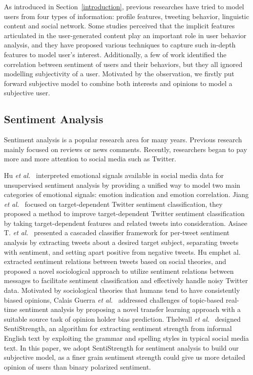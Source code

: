 \documentclass{acm_proc_article-sp}
\begin{document}
As introduced in Section~\ref{introduction}, previous researches have tried to model users from four types of information: profile features, tweeting behavior, linguistic content and social network. 
Some studies perceived that the implicit features articulated in the user-generated content play an important role in user behavior analysis, and they have proposed various techniques to capture such in-depth features to model user's interest. 
Additionally, a few of work identified the correlation between sentiment of users and their behaviors, but they all ignored modelling subjectivity of a user.
Motivated by the observation, we firstly put forward subjective model to combine both interests and opinions to model a subjective user.

\subsection{Sentiment Analysis}
Sentiment analysis is a popular research area for many years. Previous research mainly focused on reviews or news comments. 
Recently, researchers began to pay more and more attention to social media such as Twitter.
 
Hu \emph{et al.}~\cite{Hu:2013www} interpreted emotional signals available in social media data for unsupervised sentiment analysis by providing a unified way to model two main categories of emotional signals: emotion indication and emotion correlation. 
Jiang \emph{et al.}~\cite{Jiang:2011TTS} focused on target-dependent Twitter sentiment classification, they proposed a method to improve target-dependent Twitter sentiment classification by taking target-dependent features and related tweets into consideration. 
Asiaee T. \emph{et al.}~\cite{AsiaeeT:2012} presented a cascaded classifier framework for per-tweet sentiment analysis by extracting tweets about a desired target subject, separating tweets with sentiment, and setting apart positive from negative tweets.
Hu emph{et al.}~\cite{Hu:2013ESR} extracted sentiment relations between tweets based on social theories, and proposed a novel sociological approach to utilize sentiment relations between messages to facilitate sentiment classification and effectively handle noisy Twitter data.
Motivated by sociological theories that humans tend to have consistently biased opinions, Calais Guerra \emph{et al.}~\cite{CalaisGuerra:2011BOT} addressed challenges of topic-based real-time sentiment analysis by proposing a novel transfer learning approach with a suitable source task of opinion holder bias prediction.
Thelwall \emph{et al.}~\cite{Thelwall:2010SSS,Thelwall:2012SSD} designed SentiStrength, an algorithm for extracting sentiment strength from informal English text by exploiting the grammar and spelling styles in typical social media text.
In this paper, we adopt SentiStrength for sentiment analysis to build our subjective model, as a finer grain sentiment strength could give us more detailed opinion of users than binary polarized sentiment.
\end{document}
